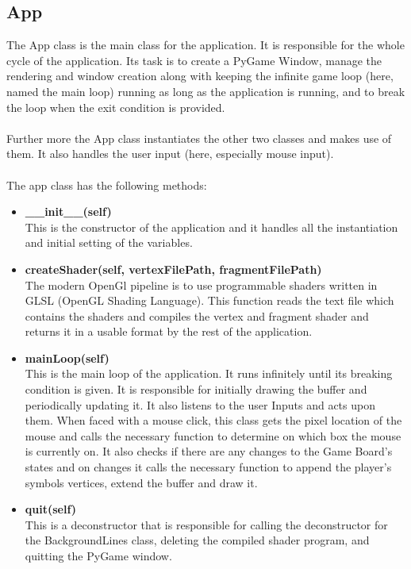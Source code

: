 \documentclass[12pt]{article}
\begin{document}
\subsection{App}
The App class is the main class for the application. It is responsible for the whole cycle of the application. Its task is to create a PyGame Window, manage the rendering and window creation along with keeping the  infinite game loop (here, named the main loop) running as long as the application is running, and to break the loop when
the exit condition is provided.\\\\
Further more the App class instantiates the other two classes and makes use of them. It also handles the user input (here, especially mouse input).\\\\
The app class has the following methods:
\begin{itemize}
    \item \textbf{\_\_init\_\_(self)}\\ This is the constructor of the application and it handles all the instantiation and initial setting of the variables.
    \item \textbf{createShader(self, vertexFilePath, fragmentFilePath)}\\ The modern OpenGl pipeline is to use programmable shaders written in GLSL (OpenGL Shading Language). This function reads the text file which contains the shaders and compiles the vertex and fragment shader and returns it in a usable format by the rest of the application.
    \item \textbf{mainLoop(self)}\\ This is the main loop of the application. It runs infinitely until its breaking condition is given. It is responsible for initially drawing the buffer and periodically updating it. It also listens to the user Inputs and acts upon them. When faced with a mouse click, this class gets the pixel location of the mouse and calls the necessary function to determine on which box the mouse is currently on. It also checks if there are any changes to the Game Board's states and on changes it calls the necessary function to append the player's symbols vertices, extend the buffer and draw it.
    \item \textbf{quit(self)}\\ This is a deconstructor that is responsible for calling the deconstructor for the BackgroundLines class, deleting the compiled shader program, and quitting the PyGame window.
\end{itemize}
\clearpage
\end{document}
